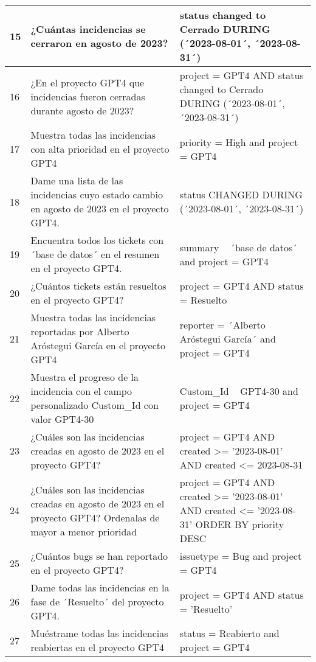 \begin{center}
\begin{longtable}{ | p{1cm} | p{8cm} | p{6cm} | }
        \hline
        15 & ¿Cuántas incidencias se cerraron en agosto de 2023? & status changed to Cerrado DURING (´2023-08-01´, ´2023-08-31´) \\
        \hline
        16 & ¿En el proyecto GPT4 que incidencias fueron cerradas durante agosto de 2023? & project = GPT4 AND status changed to Cerrado DURING (´2023-08-01´, ´2023-08-31´) \\
        \hline
        17 & Muestra todas las incidencias con alta prioridad en el proyecto GPT4 & priority = High and project = GPT4 \\
        \hline
        18 & Dame una lista de las incidencias cuyo estado cambio en agosto de 2023 en el proyecto GPT4. & status CHANGED DURING (´2023-08-01´, ´2023-08-31´) \\
        \hline
        19 & Encuentra todos los tickets con ´base de datos´ en el resumen en el proyecto GPT4. & summary ~ ´base de datos´ and project = GPT4 \\
        \hline
        20 & ¿Cuántos tickets están resueltos en el proyecto GPT4? & project = GPT4 AND status = Resuelto \\
        \hline
        21 & Muestra todas las incidencias reportadas por Alberto Aróstegui García en el proyecto GPT4 & reporter = ´Alberto Aróstegui García´ and project = GPT4 \\
        \hline
        22 & Muestra el progreso de la incidencia con el campo personalizado Custom\_Id con valor GPT4-30 & Custom\_Id ~ GPT4-30 and project = GPT4 \\
        \hline
        23 & ¿Cuáles son las incidencias creadas en agosto de 2023 en el proyecto GPT4? & project = GPT4 AND created >= '2023-08-01' AND created <= 2023-08-31 \\
        \hline
        24 & ¿Cuáles son las incidencias creadas en agosto de 2023 en el proyecto GPT4? Ordenalas de mayor a menor prioridad & project = GPT4 AND created >= '2023-08-01' AND created <= '2023-08-31' ORDER BY priority DESC \\
        \hline
        25 & ¿Cuántos bugs se han reportado en el proyecto GPT4? & issuetype = Bug and project = GPT4 \\
        \hline
        26 & Dame todas las incidencias en la fase de ´Resuelto´ del proyecto GPT4. & project = GPT4 AND status = 'Resuelto' \\
        \hline
        27 & Muéstrame todas las incidencias reabiertas en el proyecto GPT4 & status = Reabierto and project = GPT4 \\

\end{longtable}
\end{center}
